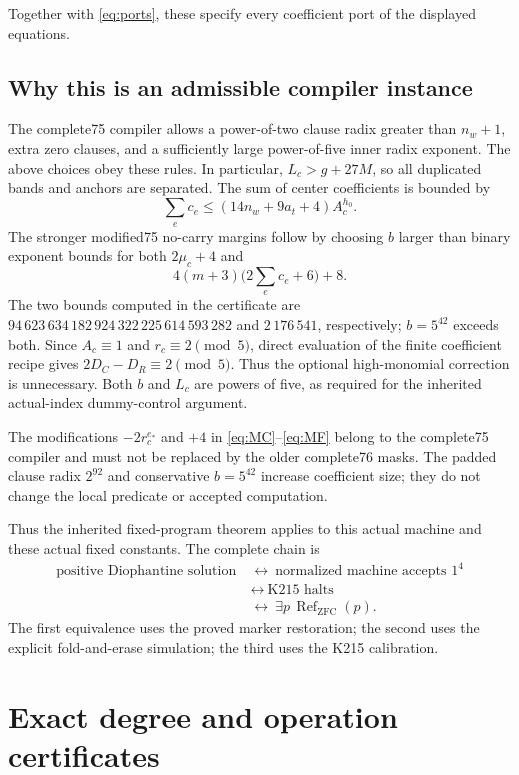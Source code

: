 \documentclass[11pt,a4paper]{article}
\theoremstyle{remark}
\newcommand{\ZFC}{\mathrm{ZFC}}
\newcommand{\ZRef}{\operatorname{Ref}_{\ZFC}}
\begin{document}
Together with \eqref{eq:ports}, these specify every coefficient port
of the displayed equations.

\subsection{Why this is an admissible compiler instance}

The complete75 compiler allows a power-of-two clause radix greater than
$n_w+1$, extra zero clauses, and a sufficiently large power-of-five
inner radix exponent. The above choices obey these rules. In particular,
$L_c>g+27M$, so all duplicated bands and anchors are separated.
The sum of center coefficients is bounded by
\[
 \sum_e c_e\le(14n_w+9a_t+4)A_c^{h_0}.
\]
The stronger modified75 no-carry margins follow by choosing $b$ larger
than binary exponent bounds for both $2\mu_c+4$ and
\[
 4(m+3)\bigl(2\sum_e c_e+6\bigr)+8.
\]
The two bounds computed in the certificate are
$94\,623\,634\,182\,924\,322\,225\,614\,593\,282$ and
$2\,176\,541$, respectively; $b=5^{42}$ exceeds both.
Since $A_c\equiv1$ and $r_c\equiv2\pmod5$, direct evaluation of the
finite coefficient recipe gives $2D_C-D_R\equiv2\pmod5$. Thus the
optional high-monomial correction is unnecessary.
Both $b$ and $L_c$ are powers of five, as required for the inherited
actual-index dummy-control argument.

The modifications $-2r_c^{e_*}$ and $+4$ in
\eqref{eq:MC}--\eqref{eq:MF} belong to the complete75 compiler and
must not be replaced by the older complete76 masks. The padded clause
radix $2^{92}$ and conservative $b=5^{42}$ increase coefficient size;
they do not change the local predicate or accepted computation.

Thus the inherited fixed-program theorem applies to this actual machine
and these actual fixed constants. The complete chain is
\[
\begin{aligned}
 \text{positive Diophantine solution}
 &\ \longleftrightarrow\ \text{normalized machine accepts }1^4\\
 &\ \longleftrightarrow\ \text{K215 halts}\\
 &\ \longleftrightarrow\ \exists p\,\ZRef(p).
\end{aligned}
\]
The first equivalence uses the proved marker restoration; the second
uses the explicit fold-and-erase simulation; the third uses the K215
calibration.

\section{Exact degree and operation certificates}
\label{sec:degrees}
\end{document}
